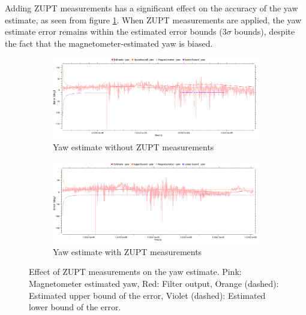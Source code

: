 Adding \gls{ZUPT} measurements has a significant effect on the accuracy of the yaw estimate, as seen from figure \ref{fig:pa:zuptYaw}. When \gls{ZUPT} measurements are applied, the yaw estimate error remains within the estimated error bounds (3$\sigma$ bounds), despite the fact that the magnetometer-estimated yaw is biased.
\begin{figure}[htp]
	\centering
    \begin{subfigure}{\textwidth}
        \includegraphics[width=\textwidth]{figs/yaw-without-zupt.png}
        \caption{Yaw estimate without ZUPT measurements}
    \end{subfigure}
    \begin{subfigure}{\textwidth}
        \includegraphics[width=\textwidth]{figs/yaw-with-zupt.png}
        \caption{Yaw estimate with ZUPT measurements}
    \end{subfigure}
    \vspace{-0.4cm}
    \caption[Effect of ZUPT measurements on the yaw estimate]{Effect of ZUPT measurements on the yaw estimate. Pink: Magnetometer estimated yaw, Red: Filter output, Orange (dashed): Estimated upper bound of the error, Violet (dashed): Estimated lower bound of the error.}
    \label{fig:pa:zuptYaw}
    \vspace{0.5cm}
\end{figure}









